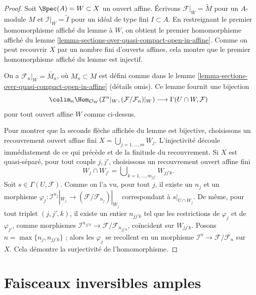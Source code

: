 \begin{proof}
Soit $\Spec(A) = W \subset X$ un ouvert affine. Écrivons
$\mathcal{F}|_W = \widetilde{M}$ pour un $A$-module $M$
et $\mathcal{I}|_W = \widetilde{I}$ pour un idéal de type
fini $I \subset A$. En restreignant le premier homomorphisme
affiché du lemme à $W$, on obtient le premier homomorphisme affiché
du lemme \ref{lemma-sections-over-quasi-compact-open-in-affine}.
Comme on peut recouvrir $X$ par un nombre fini d'ouverts affines, cela
montre que le premier homomorphisme affiché du lemme est injectif.

\medskip\noindent
On a $\mathcal{F}_n|_W = \widetilde{M_n}$, où
$M_n \subset M$ est défini comme dans
le lemme \ref{lemma-sections-over-quasi-compact-open-in-affine}
(détails omis). Ce lemme fournit une bijection
$$
\colim_n  \Hom_{\mathcal{O}_W}(
\mathcal{I}^n|_W, (\mathcal{F}/\mathcal{F}_n)|_W)
\longrightarrow
\Gamma(U \cap W, \mathcal{F})
$$
pour tout ouvert affine $W$ comme ci-dessus.

\medskip\noindent
Pour montrer que la seconde flèche affichée du lemme est bijective,
choisissons un recouvrement ouvert affine fini $X = \bigcup_{j = 1, \ldots, m} W_j$.
L'injectivité découle immédiatement de ce qui précède et de la finitude du
recouvrement. Si $X$ est quasi-séparé, pour tout couple
$j, j'$, choisissons un recouvrement ouvert affine fini
$$
W_j \cap W_{j'} = \bigcup\nolimits_{k = 1, \ldots, m_{jj'}} W_{jj'k}.
$$
Soit $s \in \Gamma(U, \mathcal{F})$. Comme on l'a vu, pour tout $j$, il existe
un $n_j$ et un morphisme
$\varphi_j : \mathcal{I}^{n_j}|_{W_j} \to
(\mathcal{F}/\mathcal{F}_{n_j})|_{W_j}$
correspondant à $s|_{U \cap W_j}$.
De même, pour tout triplet $(j, j', k)$, il existe un entier
$n_{jj'k}$ tel que les restrictions de $\varphi_j$ et de $\varphi_{j'}$,
comme morphismes $\mathcal{I}^{n_{jj'k}} \to \mathcal{F}/\mathcal{F}_{n_{jj'k}}$,
coïncident sur $W_{jj'k}$. Posons $n = \max\{n_j, n_{jj'k}\}$ ; alors
les $\varphi_j$ se recollent en un morphisme
$\mathcal{I}^n \to \mathcal{F}/\mathcal{F}_n$ sur $X$.
Cela démontre la surjectivité de l'homomorphisme.
\end{proof}













\section{Faisceaux inversibles amples}
\label{section-ample}

